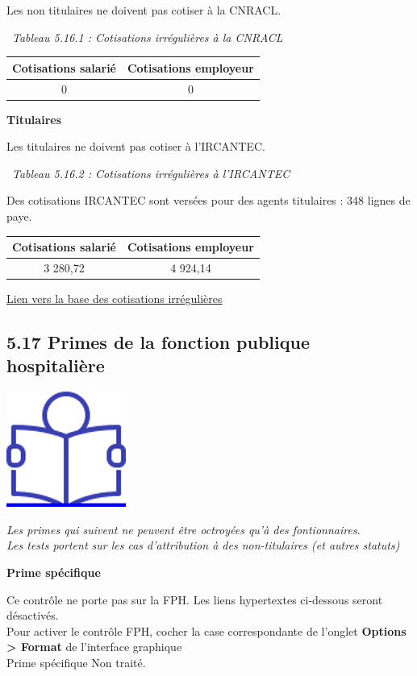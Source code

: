 Les non titulaires ne doivent pas cotiser à la CNRACL.

~\emph{Tableau 5.16.1 : Cotisations irrégulières à la CNRACL}

\begin{longtable}[]{@{}cc@{}}
\toprule
Cotisations salarié & Cotisations employeur\tabularnewline
\midrule
\endhead
0 & 0\tabularnewline
\bottomrule
\end{longtable}

\textbf{Titulaires}

Les titulaires ne doivent pas cotiser à l'IRCANTEC.

~\emph{Tableau 5.16.2 : Cotisations irrégulières à l'IRCANTEC}

Des cotisations IRCANTEC sont versées pour des agents titulaires : 348
lignes de paye.

\begin{longtable}[]{@{}cc@{}}
\toprule
Cotisations salarié & Cotisations employeur\tabularnewline
\midrule
\endhead
3 280,72 & 4 924,14\tabularnewline
\bottomrule
\end{longtable}

\href{../Bases/Reglementation/Cotisations.irreg.ircantec.csv}{Lien vers la
base des cotisations irrégulières}

\hypertarget{primes-de-la-fonction-publique-hospitaliere}{%
\subsection{5.17 Primes de la fonction publique
hospitalière}\label{primes-de-la-fonction-publique-hospitaliere}}

\href{../Docs/Notices/fiche_FPH.odt}{\includegraphics{icones/Notice.png}}

\emph{Les primes qui suivent ne peuvent être octroyées qu'à des
fontionnaires.}\\
\emph{Les tests portent sur les cas d'attribution à des non-titulaires
(et autres statuts)}

\textbf{Prime spécifique}

Ce contrôle ne porte pas sur la FPH. Les liens hypertextes ci-dessous
seront désactivés.\\
Pour activer le contrôle FPH, cocher la case correspondante de l'onglet
\textbf{Options \textgreater{} Format} de l'interface graphique\\
Prime spécifique Non traité.

